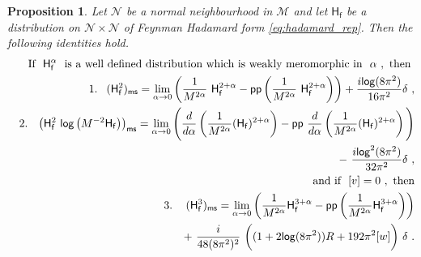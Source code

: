 \documentclass[11pt]{book}
\newcommand{\pp}{\mathsf{pp}}
\newcommand{\ms}{\mathsf{ms}}
\renewcommand{\log}{\mathsf{log}}
\newcommand{\Mcal}{\mathcal{M}}
\newcommand{\Ncal}{\mathcal{N}}
\newcommand{\Hsf}{\mathsf{H}}
\newcommand{\fsf}{\mathsf{f}}
\theoremstyle{break}
\newtheorem{proposition}{Proposition}
\begin{document}
\begin{proposition}\label{prop:equivalent_scheme}
Let $\Ncal$ be a normal neighbourhood in $\Mcal$ and let $\Hsf_\fsf$ be a distribution on $\Ncal \times \Ncal$ of Feynman Hadamard form \eqref{eq:hadamard_rep}. Then the following identities hold.
%
\begin{eqnarray*}
%
&& \hspace*{-18pt} \mbox{If } \ \Hsf_\fsf^{\alpha} \ \mbox{ is a well defined distribution which is weakly meromorphic in } \ \alpha \ , \mbox{ then } \\
%
&& 1. \hspace*{8pt} (\Hsf_\fsf^2)_\ms = \lim_{\alpha\to 0} \left( \frac{1}{M^{2\alpha}} \ \Hsf_\fsf^{2+\alpha} - \pp\left(\frac{1}{M^{2\alpha}} \ \Hsf_\fsf^{2+\alpha} \right) \right) + \frac{i\log(8\pi^2)}{16\pi^2} \delta \ , \\
%
&& 2. \hspace*{8pt} \left(\Hsf_\fsf^2 \ \log \left(M^{-2}\Hsf_\fsf\right)\right)_\ms = \lim_{\alpha\to 0} \Bigg(\frac{d}{d\alpha}\left(\frac{1}{M^{2\alpha}}(\Hsf_\fsf)^{2+\alpha}\right) - \pp \ \frac{d}{d\alpha}\left(\frac{1}{M^{2\alpha}}(\Hsf_\fsf)^{2+\alpha}\right)\Bigg) \\
&& \hspace*{145pt} - \ \frac{i\log^2(8\pi^2)}{32\pi^2}\delta \ , \\
%
&& \hspace*{-18pt} \mbox{ and if } \ [v]=0 \ , \ \mbox{then} \\
%
&& 3. \hspace*{12pt} (\Hsf_\fsf^3)_\ms = \lim_{\alpha\to 0}\left(\frac{1}{M^{2\alpha}} \Hsf_\fsf^{3+\alpha} - \pp\left(\frac{1}{M^{2\alpha}} \Hsf_\fsf^{3+\alpha} \right)\right) \\
&& \hspace*{70pt} + \ \frac{i}{48(8\pi^2)^2} \ \bigg((1+2\log(8\pi^2))R+192\pi^2[w]\bigg) \ \delta \ . \\
%
\end{eqnarray*}
%
\end{proposition}
\end{document}
